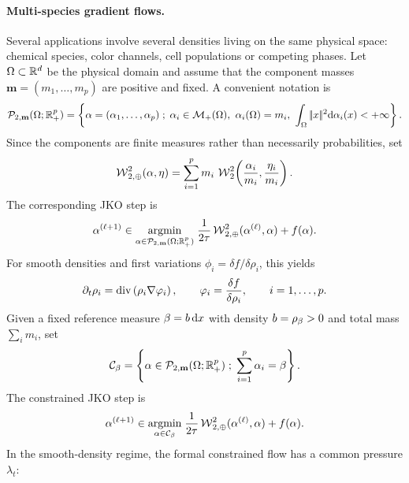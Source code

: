 \paragraph{Multi-species gradient flows.}
Several applications involve several densities living on the same physical space: chemical species, color channels, cell populations or competing phases. Let $\Omega\subset\mathbb{R}^d$ be the physical domain and assume that the component masses $\mathbf m=(m_1,\ldots,m_p)$ are positive and fixed. A convenient notation is
\begin{equation}\label{eq-multispecies-space}
\Pp_{2,\mathbf m}(\Omega;\RR_+^p)=
\enscond{\alpha=(\alpha_1,\ldots,\alpha_p)}
{\alpha_i\in\Mm_+(\Omega),\ \alpha_i(\Omega)=m_i,\ \int_\Omega\norm{x}^2\d\alpha_i(x)<+\infty}.
\end{equation}
Since the components are finite measures rather than necessarily probabilities, set
\begin{equation}\label{eq-multispecies-product-metric}
\operatorname{\mathcal{W}}_{2,\oplus}^2(\alpha,\eta)=
\sum_{i=1}^p m_i\,
\operatorname{\mathcal{W}}_2^2\!\left(\frac{\alpha_i}{m_i},\frac{\eta_i}{m_i}\right).
\end{equation}
The corresponding JKO step is
\begin{equation}\label{eq-multispecies-jko}
\alpha^{(\ell+1)}
\in
\underset{\alpha\in\mathcal{P}_{2,\mathbf m}(\Omega;\mathbb{R}_+^p)}{\operatorname{argmin}}\;
\frac{1}{2\tau}\operatorname{\mathcal{W}}_{2,\oplus}^2(\alpha^{(\ell)},\alpha)+f(\alpha).
\end{equation}
For smooth densities and first variations $\phi_i=\delta f/\delta\rho_i$, this yields
\begin{equation}\label{eq-multispecies-pde}
\partial_t\rho_i=\operatorname{div}\left(\rho_i\nabla\varphi_i\right),
\qquad
\varphi_i=\frac{\delta f}{\delta\rho_i},
\qquad i=1,\ldots,p.
\end{equation}
Given a fixed reference measure $\beta=b\,\mathrm{d} x$ with density $b=\rho_{\beta}>0$ and total mass $\sum_i m_i$, set
\begin{equation}\label{eq-multispecies-composition-constraint}
\mathcal C_\beta=
\left\{ \alpha\in\mathcal{P}_{2,\mathbf m}(\Omega;\mathbb{R}_+^p) \;;\; \sum_{i=1}^p \alpha_i=\beta \right\}.
\end{equation}
The constrained JKO step is
\begin{equation}\label{eq-multispecies-constrained-jko}
\alpha^{(\ell+1)}
\in
\underset{\alpha\in\mathcal C_\beta}{\operatorname{argmin}}\;
\frac{1}{2\tau}\operatorname{\mathcal{W}}_{2,\oplus}^2(\alpha^{(\ell)},\alpha)+f(\alpha).
\end{equation}
In the smooth-density regime, the formal constrained flow has a common pressure $\lambda_t$:
